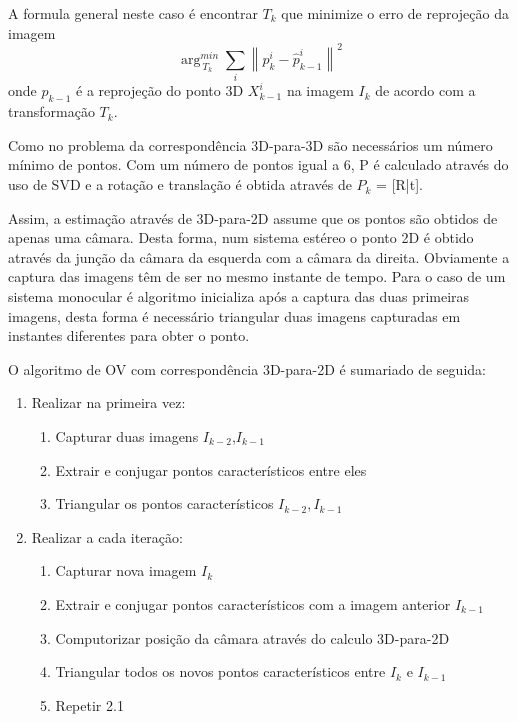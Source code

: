 A formula general neste caso é encontrar \textit{$T_k$} que minimize o erro de reprojeção da imagem \[ \arg_{\ T_k}^{min} \sum_{i}{\left \| p_k^i - \hat{p}_{k-1}^i \right \|}^2 \]
onde \textit{$p_{k-1}$} é a reprojeção do ponto 3D \textit{$X_{k-1}^i$} na imagem \textit{$I_k$} de acordo com a transformação \textit{$T_k$}. 

Como no problema da correspondência 3D-para-3D são necessários um número mínimo de pontos. Com um número de pontos igual a 6, P é calculado através do uso de SVD e a rotação e translação é obtida através de $P_k$ = [R|t]. 

Assim, a estimação através de 3D-para-2D assume que os pontos são obtidos de apenas uma câmara. Desta forma, num sistema estéreo o ponto 2D é obtido através da junção da câmara da esquerda com a câmara da direita. Obviamente a captura das imagens têm de ser no mesmo instante de tempo.  Para o caso de um sistema monocular é algoritmo inicializa após a captura das duas primeiras imagens, desta forma é necessário triangular duas imagens capturadas em instantes diferentes para obter o ponto.

O algoritmo de OV com correspondência 3D-para-2D é sumariado de seguida:
\begin{enumerate}
	\item Realizar na primeira vez:
	\begin{enumerate}[label*=\arabic*.]
		\item Capturar duas imagens \textit{$I_{k-2}$},\textit{$I_{k-1}$} 
		\item Extrair e conjugar pontos característicos entre eles
		\item Triangular os pontos característicos \textit{$I_{k-2},I_{k-1}$}
	\end{enumerate}
	\item Realizar a cada iteração:
	\begin{enumerate}[label*=\arabic*.]
		\item Capturar nova imagem \textit{$I_k$}
		\item Extrair e conjugar pontos característicos com a imagem anterior \textit{$I_{k-1}$}
		\item Computorizar posição da câmara através do calculo 3D-para-2D
		\item Triangular todos os novos pontos característicos entre \textit{$I_k$} e \textit{$I_{k-1}$}
		\item Repetir 2.1
	\end{enumerate}
	
\end{enumerate}




